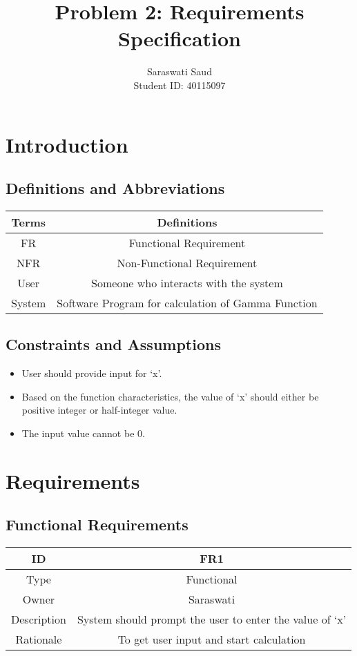 \documentclass[a4paper,12pt]{article}
\title{Problem 2: Requirements Specification}
\author{Saraswati Saud \\
Student ID: 40115097}
\date{}
\begin{document}
\maketitle
\section{Introduction}
    \subsection{Definitions and Abbreviations}
    \begin{center}
    \begin{tabular}{||c c||} 
     \hline
     Terms & Definitions \\ 
     \hline\hline
     FR & Functional Requirement \\ 
     \hline
     NFR & Non-Functional Requirement \\
     \hline
     User & Someone who interacts with the system \\
     \hline
     System & Software Program for calculation of Gamma Function \\
     \hline
    \end{tabular}
    \end{center}
     
    \subsection{Constraints and Assumptions}
    \begin{itemize}
        \item User should provide input for ‘x’.
        \item Based on the function characteristics, the value of ‘x’ should either be positive integer or half-integer value.
        \item The input value cannot be 0.
    \end{itemize}
    
    \section{Requirements}
        \subsection{Functional Requirements}
        \begin{center}
        \begin{tabular}{||c c||} 
         \hline
         ID & FR1 \\ 
         \hline
         Type & Functional \\
         \hline
         Owner & Saraswati \\
         \hline
         Description & System should prompt the user to enter the value of ‘x’ \\
         \hline
         Rationale & To get user input and start calculation \\
         \hline
        \end{tabular}
        \end{center}
        
\end{document}
